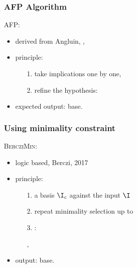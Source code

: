 \begin{frame}
\frametitle{AFP Algorithm}

\textsc{AFP}:
\begin{itemize}
	\item derived from Angluin, ,
	\item principle:
		\begin{itemize}
			\item[\color{belize} 1.] take implications one by one,
			\item[\color{belize} 2.] refine the hypothesis:
			\item[ ] 
			\item[ ] 
			
		\end{itemize}
	
	\item expected output:  base.

\end{itemize}

\end{frame}

\begin{frame}
\frametitle{Using minimality constraint}

\textsc{BercziMin}:
\begin{itemize}
	\item logic based, Berczi, 2017
	\item principle:
		\begin{itemize}
			\item[\color{belize} 1.]  a basis $\I_c$ against the input $\I$
			
			\item[\color{belize} 2.] repeat minimality selection up to 
			
			\item[\color{belize} 3.] :
			
			\item[ ] ,
			
			\item[ ] 
			 
		\end{itemize}
	\item output:  base.
\end{itemize}

\end{frame}




